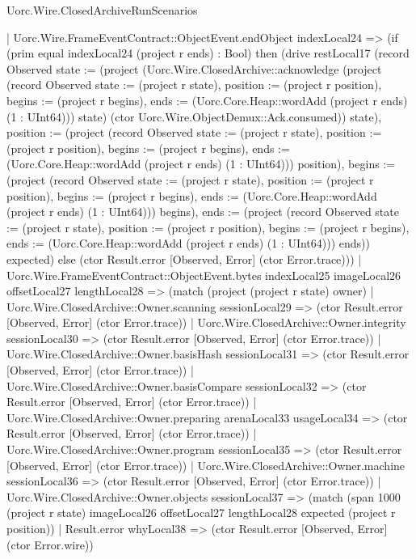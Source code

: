 \begin{lexlean}{Uorc.Wire.ClosedArchiveRunScenarios}
\begin{semanticmodule}
{        | Uorc.Wire.FrameEventContract::ObjectEvent.endObject indexLocal24 => (if (prim equal indexLocal24 (project r ends) : Bool) then (drive restLocal17 (record Observed {state := (project (Uorc.Wire.ClosedArchive::acknowledge (project (record Observed {state := (project r state), position := (project r position), begins := (project r begins), ends := (Uorc.Core.Heap::wordAdd (project r ends) (1 : UInt64))}) state) (ctor Uorc.Wire.ObjectDemux::Ack.consumed)) state), position := (project (record Observed {state := (project r state), position := (project r position), begins := (project r begins), ends := (Uorc.Core.Heap::wordAdd (project r ends) (1 : UInt64))}) position), begins := (project (record Observed {state := (project r state), position := (project r position), begins := (project r begins), ends := (Uorc.Core.Heap::wordAdd (project r ends) (1 : UInt64))}) begins), ends := (project (record Observed {state := (project r state), position := (project r position), begins := (project r begins), ends := (Uorc.Core.Heap::wordAdd (project r ends) (1 : UInt64))}) ends)}) expected) else (ctor Result.error [Observed, Error] (ctor Error.trace)))
        | Uorc.Wire.FrameEventContract::ObjectEvent.bytes indexLocal25 imageLocal26 offsetLocal27 lengthLocal28 => (match (project (project r state) owner)
          | Uorc.Wire.ClosedArchive::Owner.scanning sessionLocal29 => (ctor Result.error [Observed, Error] (ctor Error.trace))
          | Uorc.Wire.ClosedArchive::Owner.integrity sessionLocal30 => (ctor Result.error [Observed, Error] (ctor Error.trace))
          | Uorc.Wire.ClosedArchive::Owner.basisHash sessionLocal31 => (ctor Result.error [Observed, Error] (ctor Error.trace))
          | Uorc.Wire.ClosedArchive::Owner.basisCompare sessionLocal32 => (ctor Result.error [Observed, Error] (ctor Error.trace))
          | Uorc.Wire.ClosedArchive::Owner.preparing arenaLocal33 usageLocal34 => (ctor Result.error [Observed, Error] (ctor Error.trace))
          | Uorc.Wire.ClosedArchive::Owner.program sessionLocal35 => (ctor Result.error [Observed, Error] (ctor Error.trace))
          | Uorc.Wire.ClosedArchive::Owner.machine sessionLocal36 => (ctor Result.error [Observed, Error] (ctor Error.trace))
          | Uorc.Wire.ClosedArchive::Owner.objects sessionLocal37 => (match (span 1000 (project r state) imageLocal26 offsetLocal27 lengthLocal28 expected (project r position))
            | Result.error whyLocal38 => (ctor Result.error [Observed, Error] (ctor Error.wire))
}
\end{semanticmodule}
\end{lexlean}
